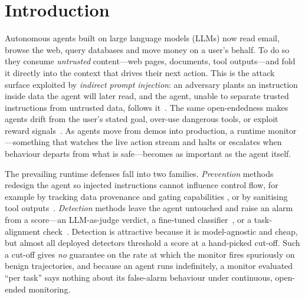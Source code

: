 \documentclass[pdflatex,sn-mathphys-num]{sn-jnl}%
\theoremstyle{thmstyleone}%
\theoremstyle{thmstyletwo}%
\theoremstyle{thmstylethree}%
\begin{document}

\maketitle

\section{Introduction}\label{sec:intro}

Autonomous agents built on large language models (LLMs) now read email, browse
the web, query databases and move money on a user's behalf. To do so they
consume \emph{untrusted} content---web pages, documents, tool
outputs---and fold it directly into the context that drives their next action.
This is the attack surface exploited by \emph{indirect prompt injection}: an
adversary plants an instruction inside data the agent will later read, and the
agent, unable to separate trusted instructions from untrusted data, follows
it~\cite{zhan2024injecagent,debenedetti2024agentdojo}. The same
open-endedness makes agents drift from the user's stated goal, over-use
dangerous tools, or exploit reward
signals~\cite{belenky2026cheap,thaman2026rewardhacking}. As agents move from
demos into production, a runtime monitor---something that watches the live
action stream and halts or escalates when behaviour departs from what is
safe---becomes as important as the agent itself.

The prevailing runtime defenses fall into two families. \emph{Prevention}
methods redesign the agent so injected instructions cannot influence control
flow, for example by tracking data provenance and gating capabilities
\cite{debenedetti2025camel}, or by sanitising tool
outputs~\cite{das2025commandsans}. \emph{Detection} methods leave the agent
untouched and raise an alarm from a score---an LLM-as-judge verdict, a
fine-tuned classifier~\cite{liu2025datasentinel}, or a task-alignment
check~\cite{jia2024taskshield}. Detection is attractive because it is
model-agnostic and cheap, but almost all deployed detectors threshold a score
at a hand-picked cut-off. Such a cut-off gives \emph{no} guarantee on the rate
at which the monitor fires spuriously on benign trajectories, and because an
agent runs indefinitely, a monitor evaluated ``per task'' says nothing about
its false-alarm behaviour under continuous, open-ended monitoring.
\end{document}
